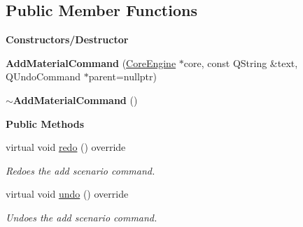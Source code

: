 \subsection*{Public Member Functions}
\begin{Indent}\textbf{ Constructors/\+Destructor}\par
\begin{DoxyCompactItemize}
\item 
\mbox{\label{classrev_1_1_add_material_command_a49597f5536242dc4a36c038e58c08b9f}} 
{\bfseries Add\+Material\+Command} (\mbox{\hyperlink{classrev_1_1_core_engine}{Core\+Engine}} $\ast$core, const Q\+String \&text, Q\+Undo\+Command $\ast$parent=nullptr)
\item 
\mbox{\label{classrev_1_1_add_material_command_acdf7484b8bb4dd0b765d97128fe0df5c}} 
{\bfseries $\sim$\+Add\+Material\+Command} ()
\end{DoxyCompactItemize}
\end{Indent}
\begin{Indent}\textbf{ Public Methods}\par
\begin{DoxyCompactItemize}
\item 
\mbox{\label{classrev_1_1_add_material_command_a7bfd4c03a820640b849218790ba748d6}} 
virtual void \mbox{\hyperlink{classrev_1_1_add_material_command_a7bfd4c03a820640b849218790ba748d6}{redo}} () override
\begin{DoxyCompactList}\small\item\em Redoes the add scenario command. \end{DoxyCompactList}\item 
\mbox{\label{classrev_1_1_add_material_command_ad6fbf76e15c49581705cc74fa76eccf4}} 
virtual void \mbox{\hyperlink{classrev_1_1_add_material_command_ad6fbf76e15c49581705cc74fa76eccf4}{undo}} () override
\begin{DoxyCompactList}\small\item\em Undoes the add scenario command. \end{DoxyCompactList}\end{DoxyCompactItemize}
\end{Indent}
